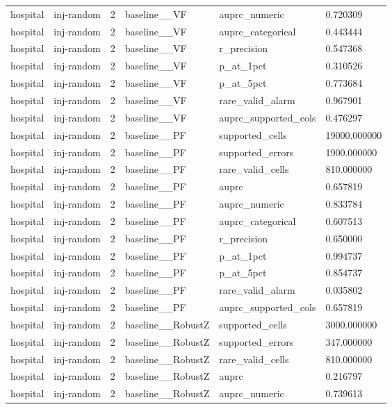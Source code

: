 \begin{tabular}{llllll}
hospital & inj-random & 2 & baseline\_\_VF & auprc\_numeric & 0.720309 \\
hospital & inj-random & 2 & baseline\_\_VF & auprc\_categorical & 0.443444 \\
hospital & inj-random & 2 & baseline\_\_VF & r\_precision & 0.547368 \\
hospital & inj-random & 2 & baseline\_\_VF & p\_at\_1pct & 0.310526 \\
hospital & inj-random & 2 & baseline\_\_VF & p\_at\_5pct & 0.773684 \\
hospital & inj-random & 2 & baseline\_\_VF & rare\_valid\_alarm & 0.967901 \\
hospital & inj-random & 2 & baseline\_\_VF & auprc\_supported\_cols & 0.476297 \\
hospital & inj-random & 2 & baseline\_\_PF & supported\_cells & 19000.000000 \\
hospital & inj-random & 2 & baseline\_\_PF & supported\_errors & 1900.000000 \\
hospital & inj-random & 2 & baseline\_\_PF & rare\_valid\_cells & 810.000000 \\
hospital & inj-random & 2 & baseline\_\_PF & auprc & 0.657819 \\
hospital & inj-random & 2 & baseline\_\_PF & auprc\_numeric & 0.833784 \\
hospital & inj-random & 2 & baseline\_\_PF & auprc\_categorical & 0.607513 \\
hospital & inj-random & 2 & baseline\_\_PF & r\_precision & 0.650000 \\
hospital & inj-random & 2 & baseline\_\_PF & p\_at\_1pct & 0.994737 \\
hospital & inj-random & 2 & baseline\_\_PF & p\_at\_5pct & 0.854737 \\
hospital & inj-random & 2 & baseline\_\_PF & rare\_valid\_alarm & 0.035802 \\
hospital & inj-random & 2 & baseline\_\_PF & auprc\_supported\_cols & 0.657819 \\
hospital & inj-random & 2 & baseline\_\_RobustZ & supported\_cells & 3000.000000 \\
hospital & inj-random & 2 & baseline\_\_RobustZ & supported\_errors & 347.000000 \\
hospital & inj-random & 2 & baseline\_\_RobustZ & rare\_valid\_cells & 810.000000 \\
hospital & inj-random & 2 & baseline\_\_RobustZ & auprc & 0.216797 \\
hospital & inj-random & 2 & baseline\_\_RobustZ & auprc\_numeric & 0.739613 \\

\end{tabular}
